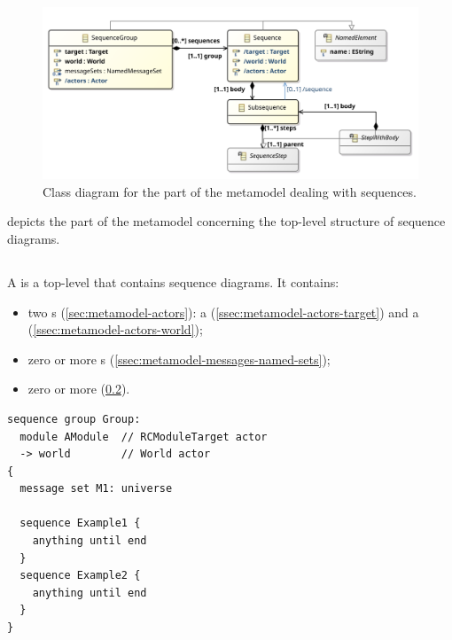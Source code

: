 \begin{figure}
	\centering
	\includegraphics[width=\textwidth]{diagrams/Sequences}
	\caption{Class diagram for the part of the \langname{} metamodel dealing with sequences.}
	\label{fig:metamodel-sequences}
\end{figure}

 depicts the part of the metamodel concerning
the top-level structure of sequence diagrams.

\subsection{\msequencegroup}

A \msequencegroup{} is a top-level \mnamedelement{} that contains sequence diagrams.
It contains:

\begin{itemize}
\item
  two \mactor s (\cref{sec:metamodel-actors}):
  a \mtarget{} (\cref{ssec:metamodel-actors-target})
  and a \mworld{} (\cref{ssec:metamodel-actors-world});
\item
  zero or more \mnamedmessageset{}s (\cref{ssec:metamodel-messages-named-sets});
\item
  zero or more \msequence{} (\cref{ssec:metamodel-sequences-sequences}).
\end{itemize}

\begin{lstlisting}[style=Example]
sequence group Group:
  module AModule  // RCModuleTarget actor
  -> world        // World actor
{
  message set M1: universe
  
  sequence Example1 {
    anything until end
  }
  sequence Example2 {
    anything until end
  }
}
\end{lstlisting}

\subsection{\msequence}\label{ssec:metamodel-sequences-sequences}

